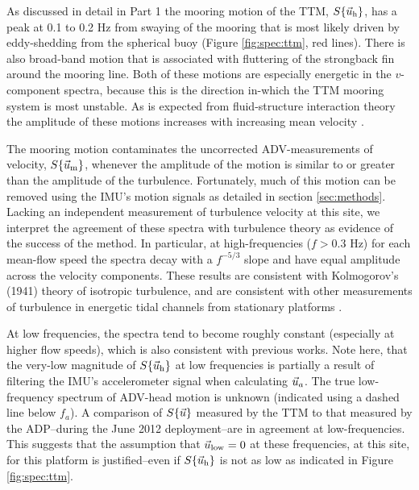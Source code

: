 As discussed in detail in Part 1 the mooring motion of the TTM, $S\{\vec{u}_\mathrm{h}\}$, has a peak at 0.1 to 0.2 Hz from swaying of the mooring that is most likely driven by eddy-shedding from the spherical buoy (Figure \ref{fig:spec:ttm}, red lines). There is also broad-band motion that is associated with fluttering of the strongback fin around the mooring line. Both of these motions are especially energetic in the $v$-component spectra, because this is the direction in-which the TTM mooring system is most unstable. As is expected from fluid-structure interaction theory the amplitude of these motions increases with increasing mean velocity \cite[]{Morison++1950}.

The mooring motion contaminates the uncorrected ADV-measurements of velocity, $S\{\vec{u}_\mathrm{m}\}$, whenever the amplitude of the motion is similar to or greater than the amplitude of the turbulence. Fortunately, much of this motion can be removed using the IMU's motion signals as detailed in section \ref{sec:methods}. Lacking an independent measurement of turbulence velocity at this site, we interpret the agreement of these spectra with turbulence theory as evidence of the success of the method. In particular, at high-frequencies ($f>0.3$ Hz) for each mean-flow speed the spectra decay with a $f^{-5/3}$ slope and have equal amplitude across the velocity components. These results are consistent with Kolmogorov's (1941) theory of isotropic turbulence, and are consistent with other measurements of turbulence in energetic tidal channels from stationary platforms \citep[]{Kolmogorov1941c,Walter++2011,Thomson++2012,McMillan++2016}.

At low frequencies, the spectra tend to become roughly constant (especially at higher flow speeds), which is also consistent with previous works. Note here, that the very-low magnitude of $S\{\vec{u}_\mathrm{h}\}$ at low frequencies is partially a result of filtering the IMU's accelerometer signal when calculating $\vec{u}_a$. The true low-frequency spectrum of ADV-head motion is unknown (indicated using a dashed line below $f_a$). A comparison of $S\{\vec{u}\}$ measured by the TTM to that measured by the ADP--during the June 2012 deployment--are in agreement at low-frequencies. This suggests that the assumption that $\vec{u}_\mathrm{low}=0$ at these frequencies, at this site, for this platform is justified--even if $S\{\vec{u}_\mathrm{h}\}$ is not as low as indicated in Figure \ref{fig:spec:ttm}.

